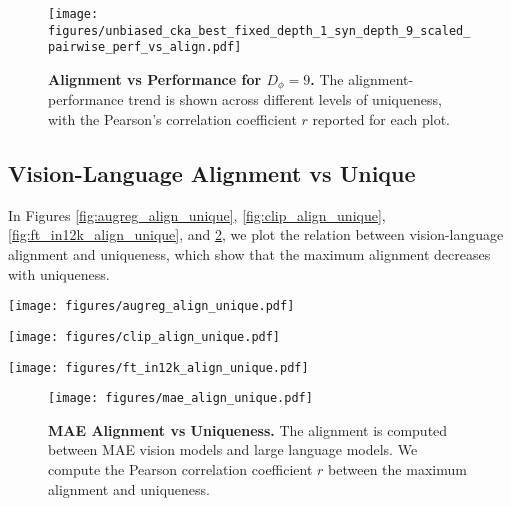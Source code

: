 \begin{figure}[t!]
    \centering
    \texttt{[image: figures/unbiased\_cka\_best\_fixed\_depth\_1\_syn\_depth\_9\_scaled\_pairwise\_perf\_vs\_align.pdf]}
    \caption{\textbf{Alignment vs Performance for $D_{\phi}=9$.} The alignment-performance trend is shown across different levels of uniqueness, with the Pearson's correlation coefficient $r$ reported for each plot. }
    \label{fig:perf_align_9}
\end{figure}


\subsection{Vision-Language Alignment vs Unique}\label{app:vision_language_align_unique}

In Figures \ref{fig:augreg_align_unique}, \ref{fig:clip_align_unique}, \ref{fig:ft_in12k_align_unique}, and \ref{fig:mae_align_unique}, we plot the relation between vision-language alignment and uniqueness, which show that the maximum alignment decreases with uniqueness.

\begin{figure*}[t!]
    \centering
    \texttt{[image: figures/augreg\_align\_unique.pdf]}
    \caption{\textbf{ImageNet21k Alignment vs Uniqueness.} The alignment is computed between vision models trained on ImageNet21k and large language models. We compute the Pearson correlation coefficient $r$ between the maximum alignment and uniqueness.}
    \label{fig:augreg_align_unique}
\end{figure*}

\begin{figure*}[t!]
    \centering
    \texttt{[image: figures/clip\_align\_unique.pdf]}
    \caption{\textbf{CLIP Alignment vs Uniqueness.} The alignment is computed between CLIP vision models and large language models. We compute the Pearson correlation coefficient $r$ between the maximum alignment and uniqueness.}
    \label{fig:clip_align_unique}
\end{figure*}

\begin{figure*}[t!]
    \centering
    \texttt{[image: figures/ft\_in12k\_align\_unique.pdf]}
    \caption{\textbf{CLIP Finetuned on ImageNet21k Alignment vs Uniqueness.} The alignment is computed between vision models trained with CLIP and finetuned on ImageNet21k and large language models. We compute the Pearson correlation coefficient $r$ between the maximum alignment and uniqueness.}
    \label{fig:ft_in12k_align_unique}
\end{figure*}
\begin{figure}[t!]
    \centering
    \texttt{[image: figures/mae\_align\_unique.pdf]}
    \caption{\textbf{MAE Alignment vs Uniqueness.} The alignment is computed between MAE vision models and large language models. We compute the Pearson correlation coefficient $r$ between the maximum alignment and uniqueness.}
    \label{fig:mae_align_unique}
\end{figure}

